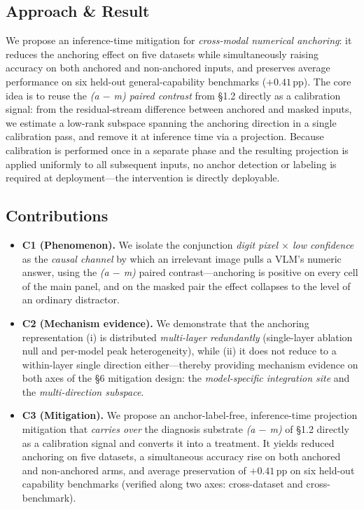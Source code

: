 \documentclass[11pt]{article}
\begin{document}
\subsection{Approach \& Result}
We propose an inference-time mitigation for \textit{cross-modal numerical anchoring}: it reduces the anchoring effect on five datasets while simultaneously raising accuracy on both anchored and non-anchored inputs, and preserves average performance on six held-out general-capability benchmarks ($+0.41$\,pp). The core idea is to reuse the \textit{(a $-$ m) paired contrast} from \S1.2 directly as a calibration signal: from the residual-stream difference between anchored and masked inputs, we estimate a low-rank subspace spanning the anchoring direction in a single calibration pass, and remove it at inference time via a projection. Because calibration is performed once in a separate phase and the resulting projection is applied uniformly to all subsequent inputs, no anchor detection or labeling is required at deployment---the intervention is directly deployable.

\subsection{Contributions}
\begin{itemize}
  \item \textbf{C1 (Phenomenon).} We isolate the conjunction \textit{digit pixel $\times$ low confidence} as the \textit{causal channel} by which an irrelevant image pulls a VLM's numeric answer, using the \textit{(a $-$ m)} paired contrast---anchoring is positive on every cell of the main panel, and on the masked pair the effect collapses to the level of an ordinary distractor.
  \item \textbf{C2 (Mechanism evidence).} We demonstrate that the anchoring representation (i) is distributed \textit{multi-layer redundantly} (single-layer ablation null and per-model peak heterogeneity), while (ii) it does not reduce to a within-layer single direction either---thereby providing mechanism evidence on both axes of the \S6 mitigation design: the \textit{model-specific integration site} and the \textit{multi-direction subspace}.
  \item \textbf{C3 (Mitigation).} We propose an anchor-label-free, inference-time projection mitigation that \textit{carries over} the diagnosis substrate \textit{(a $-$ m)} of \S1.2 directly as a calibration signal and converts it into a treatment. It yields reduced anchoring on five datasets, a simultaneous accuracy rise on both anchored and non-anchored arms, and average preservation of $+0.41$\,pp on six held-out capability benchmarks (verified along two axes: cross-dataset and cross-benchmark).
\end{itemize}
\end{document}
